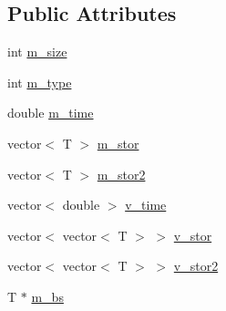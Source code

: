\subsection*{Public Attributes}
\begin{DoxyCompactItemize}
\item 
int \hyperlink{classVectorSerialize2_af8eaa31f7a05b4fefedf7c3aea69f89c}{m\-\_\-size}
\item 
int \hyperlink{classVectorSerialize2_a7642e9343ecdbc62835356b89f9c9d2d}{m\-\_\-type}
\item 
double \hyperlink{classVectorSerialize2_ac58f92faa04b0256d02d007846d602b0}{m\-\_\-time}
\item 
vector$<$ T $>$ \hyperlink{classVectorSerialize2_ac7c35c9c34fcc9e1c20fc01704c4c92c}{m\-\_\-stor}
\item 
vector$<$ T $>$ \hyperlink{classVectorSerialize2_a5305cb76c79ff91a0e2a05bb0b76b59c}{m\-\_\-stor2}
\item 
vector$<$ double $>$ \hyperlink{classVectorSerialize2_a22a2c759bc2e39c739ee1010c7f1078c}{v\-\_\-time}
\item 
vector$<$ vector$<$ T $>$ $>$ \hyperlink{classVectorSerialize2_a1606b8f8be4a619436a791c23ce0d644}{v\-\_\-stor}
\item 
vector$<$ vector$<$ T $>$ $>$ \hyperlink{classVectorSerialize2_a9e681c82d96515f9adfce7cc7d6bf2cc}{v\-\_\-stor2}
\item 
T $\ast$ \hyperlink{classVectorSerialize2_aa0db99cb2a6c40c5d7338c7ca250bc00}{m\-\_\-bs}
\end{DoxyCompactItemize}


